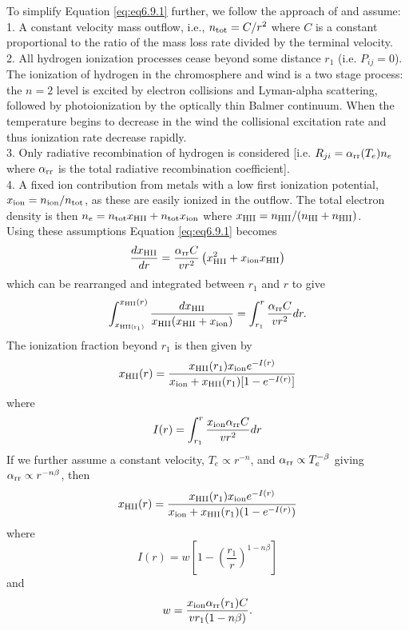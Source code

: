 To simplify Equation \ref{eq:eq6.9.1} further, we follow the approach of \cite{glassgold_1986} and assume:\\
1. A constant velocity mass outflow, i.e., $n_{\rm{tot}}=C/r^2$ where $C$ is a constant proportional to the ratio of the mass loss rate divided by the terminal velocity.\\
2. All hydrogen ionization processes cease beyond some distance $r_{1}$ (i.e. $P_{ij}=0$). The ionization of hydrogen in the chromosphere and wind is a two stage process: the $n = 2$ level is excited by electron collisions and Lyman-alpha scattering, followed by photoionization by the optically thin Balmer continuum. When the temperature begins to decrease in the wind the collisional excitation rate and thus ionization rate decrease rapidly.\\
3. Only radiative recombination of hydrogen is considered [i.e. $R_{ji}=\alpha _{\rm{rr}}(T_e)n_e$ where $\alpha _{\rm{rr}}$ is the total radiative recombination coefficient].\\
4. A fixed ion contribution from metals with a low first ionization potential, $x_{\rm{ion}}=n_{\rm{ion}}/n_{\rm{tot}}$, as these are easily ionized in the outflow. The total electron density is then $n_e=n_{\rm{tot}}x_{\rm{HII}} + n_{\rm{tot}}x_{\rm{ion}}$ where  $x_{\rm{HII}}=n_{\rm{HII}}/(n_{\rm{HI}}+n_{\rm{HII}})$.\\
Using these assumptions Equation \ref{eq:eq6.9.1} becomes
\begin{equation}
\frac{dx_{\rm{HII}}}{dr}=\frac{\alpha _{\rm{rr}}C}{vr^2}\left(x_{\rm{HII}}^2 +x_{\rm{ion}}x_{\rm{HII}} \right)
\end{equation}
which can be rearranged and integrated between $r_1$ and $r$ to give
\begin{equation}
\int_{x_{\rm{HII}(r_1)}}^{x_{\rm{HII}}(r)}\frac{dx_{\rm{HII}}}{x_{\rm{HII}}(x_{\rm{HII}}+x_{\rm{ion}})}=\int_{r_{1}}^r \frac{\alpha _{\rm{rr}} C }{vr^2}dr.
\end{equation}
The ionization fraction beyond $r_{1}$ is then given by
\begin{equation}
x_{\rm{HII}}(r)= \frac{x_{\rm{HII}}(r_1)x_{\rm{ion}}e^{-I(r)}}{x_{\rm{ion}}+x_{\rm{HII}}(r_1)[1 - e^{-I(r)}]}
\label{eq:eq4}
\end{equation}
where
\begin{equation}
I(r)=\int_{r_{1}}^r \frac{x_{\rm{ion}} \alpha _{\rm{rr}}C }{vr^2}dr
\end{equation}
If we further assume a constant velocity, $T_{e} \propto r^{-n}$, and $\alpha _{\rm{rr}} \propto T_e ^{-\beta}$ giving $\alpha _{\rm{rr}} \propto r^{-n\beta}$, then
\begin{equation}
x_{\rm{HII}}(r)=\frac{x_{\rm{HII}}(r_1)x_{\rm{ion}}e^{-I(r)}}{x_{\rm{ion}}+x_{\rm{HII}}(r_1)(1-e^{-I(r)})}
\label{eq:eq6.9.1.5}
\end{equation}
where
\begin{equation}
I(r)=w\left[1-\left(\frac{r_1}{r}\right)^{1-n\beta} \right]
\label{eq:eq6.9.1.6}
\end{equation}
and 
\begin{equation}
w=\frac{x_{\rm{ion}}\alpha_{\rm{rr}}(r_1)C}{vr_1(1-n\beta)}.
\label{eq:eq6.9.1.7}
\end{equation}

